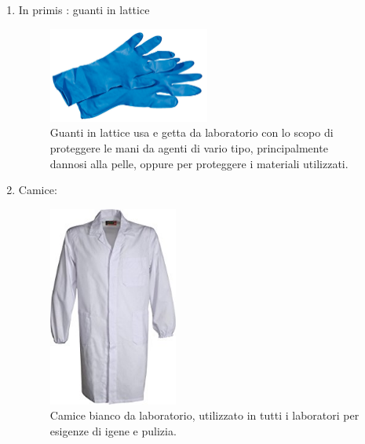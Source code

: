 \documentclass{article}
\begin{document}
	\begin{enumerate}

		\item In primis : guanti in lattice

		\begin{figure}[H]

			\includegraphics[width=0.5\textwidth]{./immagini/guanti.jpg}
			\caption{Guanti in lattice usa e getta da laboratorio con lo scopo di proteggere le mani da agenti di vario tipo, principalmente dannosi alla pelle,
			oppure per proteggere i materiali utilizzati.}
			\label{guanti}

		\end{figure}

		\vspace{0.5cm}


		\item Camice:

		\begin{figure}[H]

			\includegraphics[width=0.4\textwidth]{./immagini/camice.jpg}
			\caption{Camice bianco da laboratorio, utilizzato in tutti i laboratori per esigenze di igene e pulizia.}
			\label{camice}

		\end{figure}

		\vspace{0.5cm}



\end{enumerate}
\end{document}
